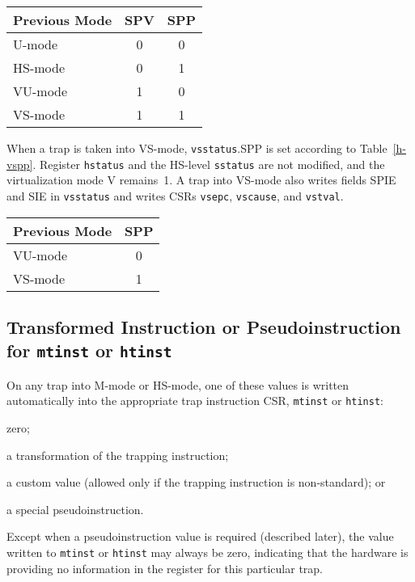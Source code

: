 \begin{table*}[h!]
\begin{center}
\begin{tabular}{|l|c|c|}
  \hline
  Previous Mode & SPV & SPP \\ \hline
  U-mode        & 0   & 0   \\
  HS-mode       & 0   & 1   \\ \hline
  VU-mode       & 1   & 0   \\
  VS-mode       & 1   & 1   \\ \hline
\end{tabular}
\end{center}
\caption{Value of {\tt hstatus} field SPV and {\tt sstatus} field SPP after a trap into HS-mode.}
\label{h-spp}
\end{table*}

When a trap is taken into VS-mode, {\tt vsstatus}.SPP is set according to
Table~\ref{h-vspp}.
Register {\tt hstatus} and the HS-level {\tt sstatus} are not modified,
and the virtualization mode V remains~1.
A trap into VS-mode also writes fields SPIE and SIE in
{\tt vsstatus} and writes CSRs {\tt vsepc}, {\tt vscause}, and
{\tt vstval}.

\begin{table*}[h!]
\begin{center}
\begin{tabular}{|l|c|}
  \hline
  Previous Mode & SPP \\ \hline
  VU-mode       & 0   \\
  VS-mode       & 1   \\ \hline
\end{tabular}
\end{center}
\caption{Value of {\tt vsstatus} field SPP after a trap into VS-mode.}
\label{h-vspp}
\end{table*}

\FloatBarrier

\subsection{Transformed Instruction or Pseudoinstruction for {\tt mtinst} or {\tt htinst}}
\label{sec:tinst-vals}

On any trap into M-mode or HS-mode, one of these values is written
automatically into the appropriate trap instruction CSR, {\tt mtinst} or
{\tt htinst}:
\begin{tightlist}
\item
zero;
\item
a transformation of the trapping instruction;
\item
a custom value (allowed only if the trapping instruction is non-standard);
or
\item
a special pseudoinstruction.
\end{tightlist}
Except when a pseudoinstruction value is required (described later), the
value written to {\tt mtinst} or {\tt htinst} may always be zero,
indicating that the hardware is providing no information in the register
for this particular trap.

